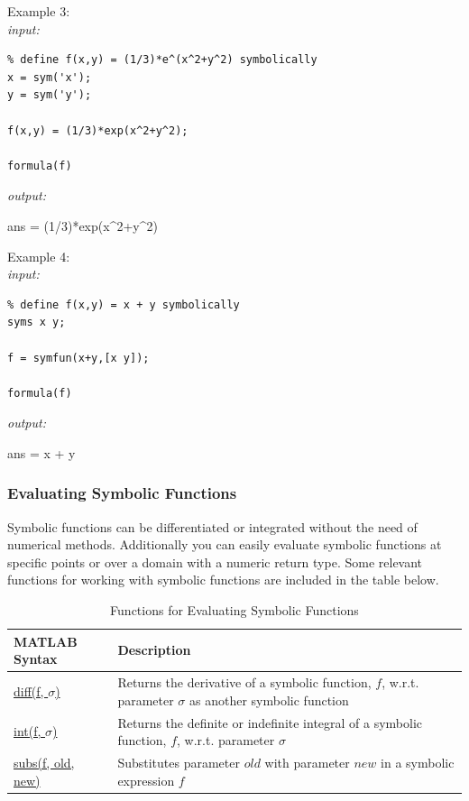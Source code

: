 \documentclass[../MATLAB_Primer.tex]{subfiles}
\begin{document}
Example 3:\\

\textit{input:}
\begin{lstlisting}
% define f(x,y) = (1/3)*e^(x^2+y^2) symbolically 
x = sym('x');
y = sym('y');

f(x,y) = (1/3)*exp(x^2+y^2); 

formula(f)
\end{lstlisting}
\textit{output:}
\begin{center}
    ans = (1/3)*exp(x\^{}2+y\^{}2) 
\end{center}

Example 4:\\

\textit{input:}
\begin{lstlisting}
% define f(x,y) = x + y symbolically 
syms x y;

f = symfun(x+y,[x y]); 

formula(f)
\end{lstlisting}
\textit{output:}
\begin{center}
    ans = x + y
\end{center}


\subsubsection{Evaluating Symbolic Functions}
Symbolic functions can be differentiated or integrated without the need of numerical methods.  Additionally you can easily evaluate symbolic functions at specific points or over a domain with a numeric return type.  Some relevant functions for working with symbolic functions are included in the table below.

\begin{table}[H]
\caption{Functions for Evaluating Symbolic Functions}
    \begin{center}
        \begin{tabular}{| C{3cm} | m{12cm}|}
            \hline
            \textbf{MATLAB Syntax} & \textbf{Description}\\
            
            \hline
            \href{https://www.mathworks.com/help/symbolic/diff.html}{\color{blue}diff(f, $\sigma$)} & Returns the derivative of a symbolic function, $f$, w.r.t. parameter $\sigma$ as another symbolic function   \\
            
            \hline
            \href{https://www.mathworks.com/help/symbolic/sym.int.html}{\color{blue}int(f, $\sigma$)} & Returns the definite or indefinite integral of a symbolic function, $f$, w.r.t. parameter $\sigma$  \\

            \hline
            \href{https://www.mathworks.com/help/symbolic/subs.html}{\color{blue}subs(f, old, new)} & Substitutes parameter $old$ with parameter $new$ in a symbolic expression $f$  \\
            \hline
            
        \end{tabular}
        \label{tab:symbolic_evaluation}
    \end{center}
\end{table}
\end{document}
